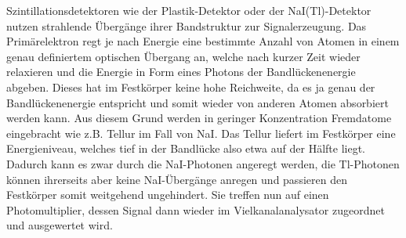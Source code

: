 			Szintillationsdetektoren wie der Plastik-Detektor oder der NaI(Tl)-Detektor nutzen strahlende Übergänge ihrer Bandstruktur zur Signalerzeugung.
			Das Primärelektron regt je nach Energie eine bestimmte Anzahl von Atomen in einem genau definiertem optischen Übergang an, welche nach kurzer Zeit wieder relaxieren und die Energie in Form eines Photons der Bandlückenenergie abgeben.
			Dieses hat im Festkörper keine hohe Reichweite, da es ja genau der Bandlückenenergie entspricht und somit wieder von anderen Atomen absorbiert werden kann.
			Aus diesem Grund werden in geringer Konzentration Fremdatome eingebracht wie z.B. Tellur im Fall von NaI.
			Das Tellur liefert im Festkörper eine Energieniveau, welches tief in der Bandlücke also etwa auf der Hälfte liegt.
			Dadurch kann es zwar durch die NaI-Photonen angeregt werden, die Tl-Photonen können ihrerseits aber keine NaI-Übergänge anregen und passieren den Festkörper somit weitgehend ungehindert.
			Sie treffen nun auf einen Photomultiplier, dessen Signal dann wieder im Vielkanalanalysator zugeordnet und ausgewertet wird.
		
